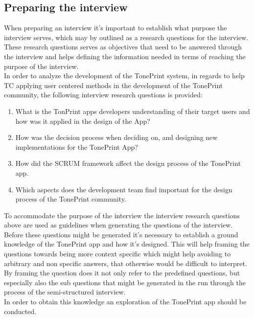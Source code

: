 \subsection{Preparing the interview}
\label{PreparingTheInterview}
%
When preparing an interview it's important to establish what purpose the interview serves, which may by outlined as a research questions for the interview. These research questions serves as objectives that need to be answered through the interview and helps defining the information needed in terms of reaching the purpose of the interview. \\
In order to analyze the development of the TonePrint system, in regards to help TC applying user centered methods in the development of the TonePrint community, the following interview research questions is provided:
\begin{enumerate}
	\item What is the TonPrint apps developers understanding of their target users and how was it applied in the design of the App?
	\item How was the decision process when deciding on, and designing new implementations for the TonePrint App?
	\item How did the SCRUM framework affect the design process of the TonePrint app.
	\item Which aspects does the development team find important for the design process of the TonePrint community. 
\end{enumerate}

\noindent
{}To accommodate the purpose of the interview the interview research questions above are used as guidelines when generating the questions of the interview. Before these questions might be generated it's necessary to establish a ground knowledge of the TonePrint app and how it's designed. This will help framing the questions towards being more context specific which might help avoiding to arbitrary and non specific answers, that otherwise would be difficult to interpret. By framing the question does it not only refer to the predefined questions, but especially also the sub questions that might be generated in the run through the process of the semi-structured interview. \\
In order to obtain this knowledge an exploration of the TonePrint app should be conducted.

